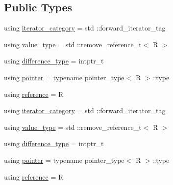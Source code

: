 \subsection*{Public Types}
\begin{DoxyCompactItemize}
\item 
using \mbox{\hyperlink{structrah_1_1iterator__facade_3_01_i_00_01_r_00_01std_01_1_1forward__iterator__tag_01_4_a3c1278be55ca5af439eb79e2ee9a3c49}{iterator\+\_\+category}} = std \+::forward\+\_\+iterator\+\_\+tag
\item 
using \mbox{\hyperlink{structrah_1_1iterator__facade_3_01_i_00_01_r_00_01std_01_1_1forward__iterator__tag_01_4_a382051259e4c6ce57365cbdd02e6536e}{value\+\_\+type}} = std \+::remove\+\_\+reference\+\_\+t$<$ R $>$
\item 
using \mbox{\hyperlink{structrah_1_1iterator__facade_3_01_i_00_01_r_00_01std_01_1_1forward__iterator__tag_01_4_abc2f97747157d90d76075b0df9a236f0}{difference\+\_\+type}} = intptr\+\_\+t
\item 
using \mbox{\hyperlink{structrah_1_1iterator__facade_3_01_i_00_01_r_00_01std_01_1_1forward__iterator__tag_01_4_a341d48f3cb5b1df5da4ee7b7bc77a4c2}{pointer}} = typename pointer\+\_\+type$<$ R $>$\+::type
\item 
using \mbox{\hyperlink{structrah_1_1iterator__facade_3_01_i_00_01_r_00_01std_01_1_1forward__iterator__tag_01_4_afc82a925c7d3fa3959bc9e8fc96dc582}{reference}} = R
\item 
using \mbox{\hyperlink{structrah_1_1iterator__facade_3_01_i_00_01_r_00_01std_01_1_1forward__iterator__tag_01_4_a3c1278be55ca5af439eb79e2ee9a3c49}{iterator\+\_\+category}} = std \+::forward\+\_\+iterator\+\_\+tag
\item 
using \mbox{\hyperlink{structrah_1_1iterator__facade_3_01_i_00_01_r_00_01std_01_1_1forward__iterator__tag_01_4_a382051259e4c6ce57365cbdd02e6536e}{value\+\_\+type}} = std \+::remove\+\_\+reference\+\_\+t$<$ R $>$
\item 
using \mbox{\hyperlink{structrah_1_1iterator__facade_3_01_i_00_01_r_00_01std_01_1_1forward__iterator__tag_01_4_abc2f97747157d90d76075b0df9a236f0}{difference\+\_\+type}} = intptr\+\_\+t
\item 
using \mbox{\hyperlink{structrah_1_1iterator__facade_3_01_i_00_01_r_00_01std_01_1_1forward__iterator__tag_01_4_a341d48f3cb5b1df5da4ee7b7bc77a4c2}{pointer}} = typename pointer\+\_\+type$<$ R $>$\+::type
\item 
using \mbox{\hyperlink{structrah_1_1iterator__facade_3_01_i_00_01_r_00_01std_01_1_1forward__iterator__tag_01_4_afc82a925c7d3fa3959bc9e8fc96dc582}{reference}} = R
\end{DoxyCompactItemize}
